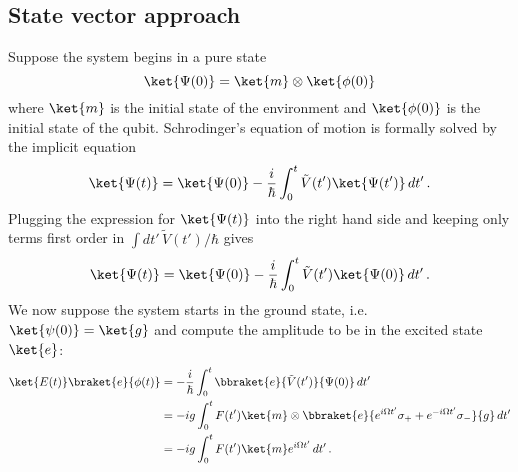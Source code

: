 \subsection{State vector approach}

Suppose the system begins in a pure state
\begin{displaymath}
\ket{\Psi(0)} = \ket{m} \otimes \ket{\phi(0)}
\end{displaymath}
where $\ket{m}$ is the initial state of the environment and $\ket{\phi(0)}$ is the initial state of the qubit.
Schrodinger's equation of motion is formally solved by the implicit equation
\begin{equation}
\ket{\Psi(t)} = \ket{\Psi(0)} - \frac{i}{\hbar} \int_0^t \tilde{V}(t') \ket{\Psi(t')} \, dt' \, .
\end{equation}
Plugging the expression for $\ket{\Psi(t)}$ into the right hand side and keeping only terms first order in $\int dt' \, \tilde{V}(t') / \hbar$ gives
\begin{equation}
\ket{\Psi(t)} = \ket{\Psi(0)} - \frac{i}{\hbar} \int_0^t \tilde{V}(t') \ket{\Psi(0)} \, dt' \, .
\end{equation}
We now suppose the system starts in the ground state, i.e. $\ket{\psi(0)}=\ket{g}$ and compute the amplitude to be in the excited state $\ket{e}$:
\begin{align}
\ket{E(t)}\braket{e}{\phi(t)}
&= -\frac{i}{\hbar} \int_0^t \bbraket{e}{\tilde{V}(t')}{\Psi(0)} \, dt' \\
&= - ig \int_0^t F(t')\ket{m} \otimes \bbraket{e}{e^{i \Omega t'} \sigma_+ + e^{-i \Omega t'} \sigma_-}{g} \, dt' \\
&= - ig \int_0^t F(t')\ket{m} e^{i \Omega t'} \, dt' \, .
\end{align}

